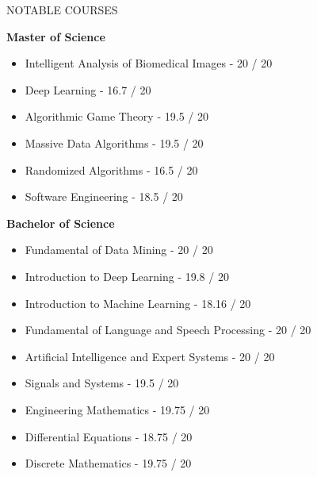 \documentclass[]{CV}
\begin{document}
\vspace{-2mm}
\begin{section}{NOTABLE COURSES}
\begin{multicols}{2}
\textbf{Master of Science}
     \begin{itemize}
	\item Intelligent Analysis of Biomedical Images - 20 / 20
	\item Deep Learning - 16.7 / 20
	\item Algorithmic Game Theory - 19.5 / 20
	\item Massive Data Algorithms - 19.5 / 20
	\item Randomized Algorithms - 16.5 / 20
	\item Software Engineering - 18.5 / 20
	\vfill
    \end{itemize}
	
    \columnbreak
\textbf{Bachelor of Science}
    \begin{itemize}
	\item Fundamental of Data Mining - 20 / 20
	\item Introduction to Deep Learning - 19.8 / 20
	\item Introduction to Machine Learning - 18.16 / 20
	\item Fundamental of Language and Speech Processing - 20 / 20
	\item Artificial Intelligence and Expert Systems - 20 / 20
	
	
	\item Signals and Systems - 19.5 / 20
	\item Engineering Mathematics - 19.75 / 20
	\item Differential Equations - 18.75 / 20
	\item Discrete Mathematics - 19.75 / 20
	
    \end{itemize}
    \end{multicols}
\end{section}
\end{document}
